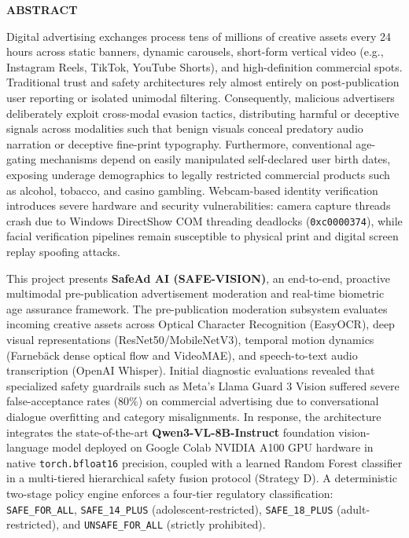 \documentclass[12pt,a4paper]{report}
\begin{document}

\newpage

\begin{center}
    \textbf{\Large ABSTRACT}
\end{center}

\vspace{0.4cm}

\noindent
Digital advertising exchanges process tens of millions of creative assets every 24 hours across static banners, dynamic carousels, short-form vertical video (e.g., Instagram Reels, TikTok, YouTube Shorts), and high-definition commercial spots. Traditional trust and safety architectures rely almost entirely on post-publication user reporting or isolated unimodal filtering. Consequently, malicious advertisers deliberately exploit cross-modal evasion tactics, distributing harmful or deceptive signals across modalities such that benign visuals conceal predatory audio narration or deceptive fine-print typography. Furthermore, conventional age-gating mechanisms depend on easily manipulated self-declared user birth dates, exposing underage demographics to legally restricted commercial products such as alcohol, tobacco, and casino gambling. Webcam-based identity verification introduces severe hardware and security vulnerabilities: camera capture threads crash due to Windows DirectShow COM threading deadlocks (\texttt{0xc0000374}), while facial verification pipelines remain susceptible to physical print and digital screen replay spoofing attacks.

\par
\vspace{0.3cm}

\noindent
This project presents \textbf{SafeAd AI (SAFE-VISION)}, an end-to-end, proactive multimodal pre-publication advertisement moderation and real-time biometric age assurance framework. The pre-publication moderation subsystem evaluates incoming creative assets across Optical Character Recognition (EasyOCR), deep visual representations (ResNet50/MobileNetV3), temporal motion dynamics (Farneb\"{a}ck dense optical flow and VideoMAE), and speech-to-text audio transcription (OpenAI Whisper). Initial diagnostic evaluations revealed that specialized safety guardrails such as Meta's Llama Guard 3 Vision suffered severe false-acceptance rates ($80\%$) on commercial advertising due to conversational dialogue overfitting and category misalignments. In response, the architecture integrates the state-of-the-art \textbf{Qwen3-VL-8B-Instruct} foundation vision-language model deployed on Google Colab NVIDIA A100 GPU hardware in native \texttt{torch.bfloat16} precision, coupled with a learned Random Forest classifier in a multi-tiered hierarchical safety fusion protocol (Strategy D). A deterministic two-stage policy engine enforces a four-tier regulatory classification: \texttt{SAFE\_FOR\_ALL}, \texttt{SAFE\_14\_PLUS} (adolescent-restricted), \texttt{SAFE\_18\_PLUS} (adult-restricted), and \texttt{UNSAFE\_FOR\_ALL} (strictly prohibited).
\end{document}
